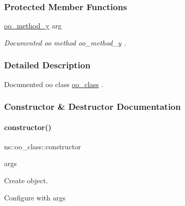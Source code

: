 \subsubsection*{Protected Member Functions}
\begin{DoxyCompactItemize}
\item 
\mbox{\hyperlink{classns_1_1oo__class_ad07feb192f34010ed66d123338c7acdd}{oo\+\_\+method\+\_\+y}} arg
\begin{DoxyCompactList}\small\item\em Documented oo method {\ttfamily oo\+\_\+method\+\_\+y} . \end{DoxyCompactList}\end{DoxyCompactItemize}


\subsubsection{Detailed Description}
Documented oo class {\ttfamily \mbox{\hyperlink{classns_1_1oo__class}{oo\+\_\+class}}} . 

\subsubsection{Constructor \& Destructor Documentation}
\mbox{\label{classns_1_1oo__class_aa26b64151d4b4b0e8b4977aae7048f9b}} 
\paragraph{\texorpdfstring{constructor()}{constructor()}}
{\footnotesize\ttfamily ns\+::oo\+\_\+class\+::constructor\begin{DoxyParamCaption}\item[{}]{args  }\end{DoxyParamCaption}}



Create object. 

Configure with args 
\begin{DoxyCode}{0}

\end{DoxyCode}
\mbox{\label{classns_1_1oo__class_af148cfc1c090a05986c68ac9452a510a}} 
